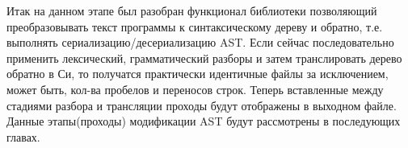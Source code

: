 

Итак на данном этапе был разобран функционал библиотеки позволяющий преобразовывать текст программы к синтаксическому дереву и обратно, 
т.е. выполнять сериализацию/десериализацию AST. Если сейчас последовательно применить лексический, грамматический разборы и затем транслировать дерево обратно в Си, то 
получатся практически идентичные файлы за исключением, может быть, кол-ва пробелов и переносов строк. 
Теперь вставленные между стадиями разбора и трансляции проходы будут отображены в выходном файле.
Данные этапы(проходы) модификации AST будут рассмотрены в последующих главах.